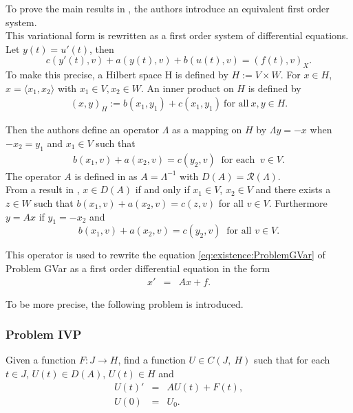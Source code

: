 \documentclass[../../main.tex]{subfiles}
\begin{document}
To prove the main results in \cite{VV02}, the authors introduce an equivalent first order system.\\

This variational form is rewritten as a first order system of differential equations. Let $y(t) = u'(t)$, then \[ c(y'(t),v)+a(y(t),v)+b(u(t),v)= (f(t),v)_{X}.\] To make this precise, a Hilbert space H is defined by $H:=V\times W$. For $x \in H$, $x = \langle x_1, x_2 \rangle$ with $x_1 \in V, x_2 \in W$. An inner product on $H$ is defined by
\begin{eqnarray*}
	(x,y)_H := b(x_1,y_1) + c(x_1,y_1) \ \textrm{for all} \ x,y \in H.
\end{eqnarray*}

Then the authors define an operator $\Lambda$ as a mapping on $H$ by $\Lambda y = -x$ when $-x_2 = y_1$ and $x_1 \in V$ such that
\begin{eqnarray}
	b(x_1,v) + a(x_2,v) = c(y_2,v) \ \textrm{ for each } \ v \in V. \label{author_mapping}
\end{eqnarray}
The operator $A$ is defined in \cite{VV02} as $A = \Lambda^{-1}$ with $D(A) = \mathcal{R}(\Lambda)$.\\

From a result in \cite{VV02}, $x \in D(A)$ if and only if $x_1 \in V$, $x_2 \in V$ and there exists a $z \in W$ such that $b(x_1,v) + a(x_2,v) = c(z,v)$ for all $v \in V$. Furthermore $y = Ax$ if $y_1 = -x_2$ and \[b(x_1,v) + a(x_2,v) = c(y_2,v)\  \textrm{ for all } v \in V.\]

This operator is used to rewrite the equation \eqref{eq:existence:ProblemGVar} of Problem GVar as a first order differential equation in the form
\begin{eqnarray}
	x' & = & Ax + f. \label{Cauchy}
\end{eqnarray}

To be more precise, the following problem is introduced.


\subsubsection*{Problem IVP}\label{sssec:existence:ProblemIVP}
Given a function $F:J\rightarrow H$, find a function $U\in C(J,\ H)$ such that for each $t\in J$, $U(t) \in D(A)$, $U(t) \in H$ and
\begin{eqnarray*}
	U(t)' & = & AU(t) + F(t),\\
	U(0) & = & U_0.
\end{eqnarray*}
\end{document}
